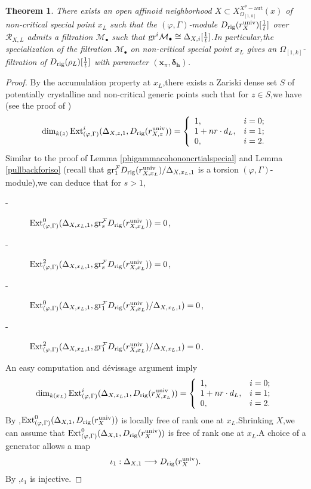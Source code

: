 \documentclass[SecEq,CM,GP]{degruyter-crelle} %
\theoremstyle{plain}
\newtheorem{thm}{Theorem}[section]
\newcommand{\ext}{{\rm Ext}}
\newcommand{\gr}{{\rm gr}}
\newcommand{\omepik}{\Omega_{[1,k]}}
\newcommand{\rig}{{\rm rig}}
\newcommand{\univer}{{\rm univ}}
\newcommand{\xfpx}{X^{X^\fp-\mathrm{aut}}_{\omepik}(x)}
\newcommand{\bx}{{\mathbf{x}}}
\newcommand{\bh}{{\mathbf{h}}}
\newcommand{\cR}{\mathcal R}
\newcommand{\cM}{\mathcal M}
\newcommand{\cF}{\mathcal F}
\newcommand{\fp}{{\mathfrak{p}}}
\begin{document}
\begin{thm}\label{localfiltration} There exists an open affinoid neighborhood $X\subset \xfpx$ of non-critical special point $x_L$ such that the $(\varphi,\Gamma)$-module $D_{\rig}(r^{\univer}_X)[\frac{1}{t}]$ over $\cR_{X,L}$ admits a filtration $\cM_\bullet$ such that $\gr^i\cM_\bullet\cong \Delta_{X,i}[\frac{1}{t}]$.\;In particular,\;the specialization of the filtration $\cM_\bullet$ on non-critical special point $x_L$ gives an $\omepik$-filtration of $D_{\rig}(\rho_L)[\frac{1}{t}]$  with parameter $({\bx}_\pi,\bm{\delta}_{\bh})$.\;
\end{thm}
\begin{proof}
By the accumulation property at $x_L$,\;there exists a Zariski dense set $S$ of potentially crystalline and non-critical generic points such that for $z\in S$,\;we have (see the proof of \cite[Proposition 4.2.7]{Ding2021})
\[\dim_{k(z)}\ext^i_{(\varphi,\Gamma)}(\Delta_{X,z,1},D_{\rig}(r^{\univer}_{X,z}))=\left\{
\begin{array}{ll}
	1, & \hbox{$i=0$;} \\
	1+nr\cdot d_L, & \hbox{$i=1$;} \\
	0, & \hbox{$i=2$.}
\end{array}
\right.\]
Similar to the proof of  Lemma \ref{phigammacohononcrtialspecial} and Lemma \ref{pullbackforiso} (recall that $\gr_1^{\cF}D_{\rig}(r^{\univer}_{X,x_L})/\Delta_{X,x_L,1}$ is a torsion $(\varphi,\Gamma)$-module),\;we can deduce that for $s>1$,\;
\begin{description}
	\item[-] $\ext^0_{(\varphi,\Gamma)}(\Delta_{X,x_L,1},\gr_s^{\cF}D_{\rig}(r^{\univer}_{X,x_L}))=0$,\;
	\item[-] $\ext^2_{(\varphi,\Gamma)}(\Delta_{X,x_L,1},\gr_s^{\cF}D_{\rig}(r^{\univer}_{X,x_L}))=0$,\;
	\item[-] $\ext^0_{(\varphi,\Gamma)}(\Delta_{X,x_L,1},\gr_1^{\cF}D_{\rig}(r^{\univer}_{X,x_L})/\Delta_{X,x_L,1})=0$,\;
	\item[-] $\ext^2_{(\varphi,\Gamma)}(\Delta_{X,x_L,1},\gr_1^{\cF}D_{\rig}(r^{\univer}_{X,x_L})/\Delta_{X,x_L,1})=0$.\;
\end{description}
An easy computation and d\'{e}vissage argument imply
\[\dim_{k(x_L)}\ext^i_{(\varphi,\Gamma)}(\Delta_{X,x_L,1},D_{\rig}(r^{\univer}_{X,x_L}))=\left\{
\begin{array}{ll}
	1, & \hbox{$i=0$;} \\
	1+nr\cdot d_L, & \hbox{$i=1$;} \\
	0, & \hbox{$i=2$.}
\end{array}
\right.\]
By \cite[Corollary 4.7]{bergdall_2017},\;$\ext^0_{(\varphi,\Gamma)}(\Delta_{X,1},D_{\rig}(r^{\univer}_X))$ is locally free of rank one at $x_L$.\;Shrinking $X$,\;we can assume that $\ext^0_{(\varphi,\Gamma)}(\Delta_{X,1},D_{\rig}(r^{\univer}_X))$ is free of rank one at $x_L$.\;A choice of a generator allows a map
\[\iota_1:\Delta_{X,1}\longrightarrow D_{\rig}(r^{\univer}_X).\]
By \cite[Lemma 5.4 (a)]{bergdall_2017},\;$\iota_1$ is injective.\;


\end{proof}
\end{document}
